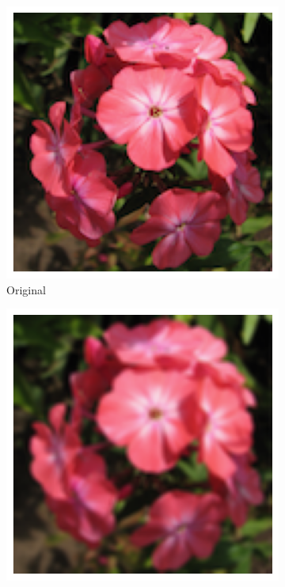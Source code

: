 \documentclass{article}
\begin{document}
\begin{figure}
	\centering
	\begin{subfigure}[b]{0.24\textwidth}
		\includegraphics[width= \textwidth]{path0}
		\caption{Original}
		\label{fg:original}
	\end{subfigure}
	\begin{subfigure}[b]{0.24\textwidth}
		\includegraphics[width= \textwidth]{difuminado}

\end{subfigure}
\end{figure}
\end{document}
